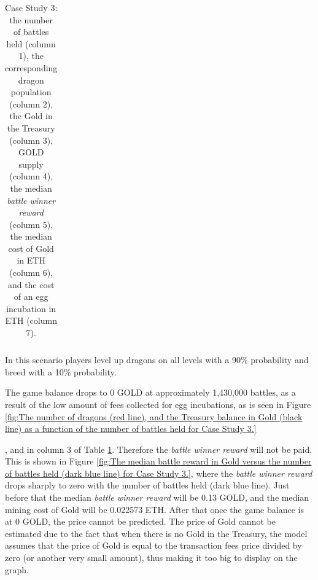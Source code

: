 \documentclass[12pt]{article}
\begin{document}
{\begin{table}[H]
\begin{tabular}{p{0.6in}p{0.64in}p{0.55in}p{0.55in}p{0.99in}p{0.9in}p{0.99in}}
\end{tabular}\caption{Case Study 3: the number of battles held (column 1), the corresponding dragon population (column 2), the Gold in the Treasury (column 3), GOLD supply (column 4), the median {\it battle winner reward} (column 5), the median cost of Gold in ETH (column 6), and the cost of an egg incubation in ETH (column 7).}
\label{tab:Same as Table 11, but for Case Study 3}

 \end{table}




In this scenario players level up dragons on all levels with a 90$\%$  probability and breed with a 10$\%$  probability.\par

The game balance drops to 0 GOLD at approximately 1,430,000 battles, as a result of the low amount of fees collected for egg incubations, as is seen in Figure \ref{fig:The number of dragons (red line), and the Treasury balance in Gold (black line) as a function of the number of battles held for Case Study 3.}}, and in column 3 of  Table \ref{tab:Same as Table 11, but for Case Study 3}. Therefore the \textit{battle winner reward} will not be paid. This is shown in Figure \ref{fig:The median battle reward in Gold versus the number of battles held (dark blue line) for Case Study 3.}, where the {\it battle winner reward} drops sharply to zero with the number of battles held (dark blue line). Just before that the median {\it battle winner reward} will be 0.13 GOLD, and the median mining cost of Gold will be 0.022573 ETH.  After that once the game balance is at 0 GOLD, the price cannot be predicted. The price of Gold cannot be estimated due to the fact that when there is no Gold in the Treasury, the model assumes that the price of Gold is equal to the transaction fees price divided by zero (or another very small amount), thus making it too big to display on the graph. \par



\end{document}
